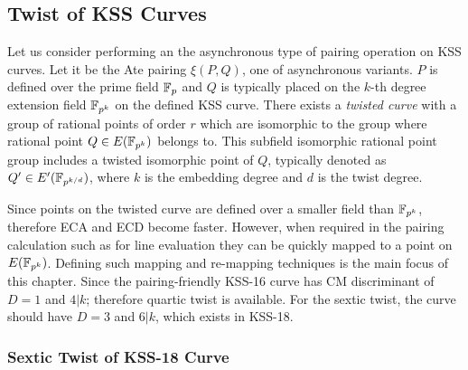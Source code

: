 \subsection{Twist of KSS Curves}
Let us consider performing an the asynchronous type of pairing operation on KSS curves.  Let it be the Ate pairing $\xi(P,Q)$, one of asynchronous variants. $P$  is defined over the prime field $\mathbb{F}_p$ and  $Q$ is typically placed on the $k$-th degree extension field $\mathbb{F}_{p^k}$ on the defined KSS curve. There exists a \textit{twisted curve} with a group of rational points of order $r$ which are isomorphic to the group where rational point $Q \in  E(\mathbb{F}_{p^k})$  belongs to. This subfield isomorphic rational point group includes a twisted isomorphic point of $Q$, typically denoted as $Q' \in E'(\mathbb{F}_{p^{k/d}})$, where $k$ is the embedding degree and $d$ is the twist degree.  

Since points on the twisted curve are defined over a smaller field than $\mathbb{F}_{p^k}$, therefore ECA and ECD become faster. 
However, when required in the pairing calculation such as  for line evaluation  they can be quickly mapped to a point on $E(\mathbb{F}_{p^k} )$. 
Defining such mapping and re-mapping techniques is the main focus of this  chapter. Since the pairing-friendly KSS-16 \cite{EPRINT:KacSchSco07} curve has CM discriminant of $D = 1$ and $4|k$; therefore quartic twist is available. For the sextic twist, the curve should have $D = 3$ and $6|k$, which exists in KSS-18.

\subsubsection{Sextic Twist of KSS-18 Curve}

